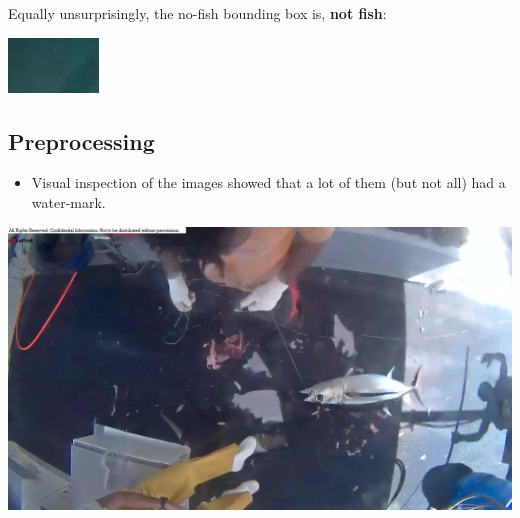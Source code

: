 \documentclass[12pt,a4paper,oneside,headinclude]{scrartcl}
\numberwithin{figure}{section}
\numberwithin{equation}{section}
\numberwithin{table}{section}
\begin{document}
Equally unsurprisingly, the no-fish bounding box is, \textbf{not fish}:

\begin{center}
\includegraphics[width=.9\linewidth]{img/Quality/nofish_00008-label_2019-06-22_12-58-47.jpg}
\end{center}

\subsection{Preprocessing}
\label{sec:org1b5eace}

\begin{itemize}
\item Visual inspection of the images showed that a lot of them (but not all) had a
water-mark.
\end{itemize}


\begin{center}
\includegraphics[width=.9\linewidth]{img/Data_Preprocessing/img_00299_2019-06-22_12-06-01.jpg}
\end{center}
\end{document}
